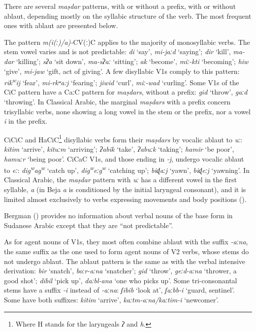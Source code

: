 \documentclass[output=paper]{langsci/langscibook}
\begin{document}
There are several \textit{maṣdar} patterns, with or without a prefix, with or without ablaut, depending mostly on the syllabic structure of the verb. The most frequent ones with ablaut are presented below.

The pattern \textit{m(i(ː)/a)-}CV(ː)C applies to the majority of monosyllabic verbs. The stem vowel varies and is not predictable: \textit{di} ‘say’, \textit{mi-jaːd} ‘saying’; \textit{dir} ‘kill’, \textit{ma-dar} ‘killing’; \textit{sʔa} ‘sit down’, \textit{ma\nobreakdash-sʔaː} ‘sitting’; \textit{ak} ‘become’, \textit{miː-kti} ‘becoming’; \textit{hiw} ‘give’, \textit{mi-jaw} ‘gift, act of giving’. A few disyllabic V1s comply to this pattern: \textit{rik\textsuperscript{w}}\textit{ij} ‘fear’, \textit{mi-rkʷa:j} ‘fearing’; \textit{jiwid} ‘curl’, \textit{miː-wad} ‘curling’. Some V1s of the CiC pattern have a CaːC pattern for \textit{maṣdars}, without a prefix: \textit{gid} ‘throw’, \textit{gaːd} ‘throwing’. In Classical Arabic, the marginal \textit{maṣdars} with a prefix concern trisyllabic verbs, none showing a long vowel in the stem or the prefix, nor a vowel \textit{i} in the prefix.

CiCiC and HaCiC\footnote{Where H stands for the laryngeals \textit{ʔ} and \textit{h}.} disyllabic verbs form their \textit{maṣdars} by vocalic ablaut to \textit{uː}: \textit{kitim} ‘arrive’, \textit{kituːm} ‘arriving’; \textit{ʔabik} ‘take’, \textit{ʔabuːk} ‘taking’; \textit{hamir} ‘be poor’, \textit{hamuːr} ‘being poor’. CiCaC V1s, and those ending in \textit{{}-j}, undergo vocalic ablaut to \textit{eː}: \textit{dig\textsuperscript{w}}\textit{ag\textsuperscript{w}} ‘catch up’, \textit{dig\textsuperscript{w}}\textit{eːg\textsuperscript{w}} ‘catching up’; \textit{biɖaːj} ‘yawn’, \textit{biɖeːj} ‘yawning’. In Classical Arabic, the \textit{maṣdar} pattern with \textit{uː} has a different vowel in the first syllable, \textit{a} (in Beja \textit{a} is conditioned by the initial laryngeal consonant), and it is limited almost exclusively to verbs expressing movements and body positions (\citealt[81]{BlachèreGaudefroy-Demombynes1975}). 

Bergman (\citeyear[35]{Bergman2002}) provides no information about verbal nouns of the base form in Sudanese Arabic except that they are “not predictable”. 

As for agent nouns of V1s, they most often combine ablaut with the suffix \textit{\nobreakdash-aːna}, the same suffix as the one used to form agent nouns of V2 verbs, whose stems do not undergo ablaut. The ablaut pattern is the same as with the verbal intensive derivation: \textit{bir} ‘snatch’, \textit{boːr-aːna} ‘snatcher’; \textit{gid} ‘throw’,\textbf{ }\textit{geːd-aːna} ‘thrower, a good shot’; \textit{dibil} ‘pick up’, \textit{daːbl-ana} ‘one who picks up’. Some tri-consonantal stems have a suffix \textit{{}-i} instead of \textit{\nobreakdash-aːna}:  \textit{ʃibib} ‘look at’, \textit{ʃaːbb\nobreakdash-i} ‘guard, sentinel'. Some have both suffixes: \textit{kitim} ‘arrive’, \textit{kaːtm-aːna/kaːtim-i} ‘newcomer’.
\end{document}
